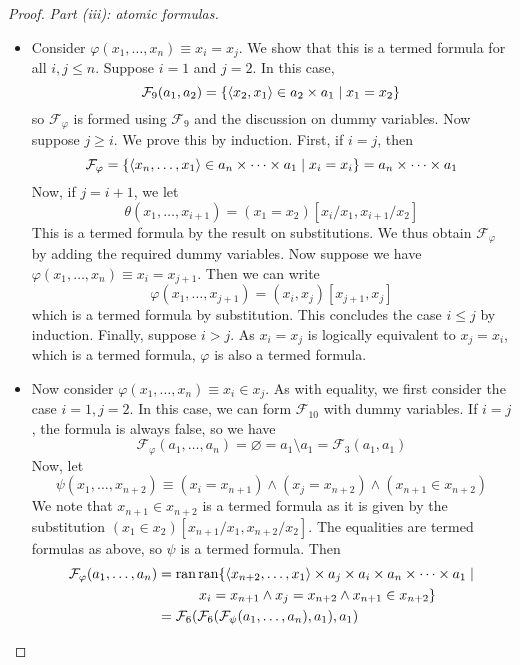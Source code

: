 \begin{proof}
    \emph{Part (iii): atomic formulas.}
    \begin{itemize}
        \item Consider \( \varphi(x_1, \dots, x_n) \equiv x_i = x_j \).
        We show that this is a termed formula for all \( i, j \leq n \).
        Suppose \( i = 1 \) and \( j = 2 \).
        In this case,
        \[ \mathcal F_9(a_1, a_2) = \qty{\langle x_2, x_1 \rangle \in a_2 \times a_1 \mid x_1 = x_2} \]
        so \( \mathcal F_\varphi \) is formed using \( \mathcal F_9 \) and the discussion on dummy variables.
        Now suppose \( j \geq i \).
        We prove this by induction.
        First, if \( i = j \), then
        \[ \mathcal F_\varphi = \qty{\langle x_n, \dots, x_1 \rangle \in a_n \times \dots \times a_1 \mid x_i = x_i} = a_n \times \dots \times a_1 \]
        Now, if \( j = i + 1 \), we let
        \[ \theta(x_1, \dots, x_{i+1}) = (x_1 = x_2)[x_i/x_1, x_{i+1}/x_2] \]
        This is a termed formula by the result on substitutions.
        We thus obtain \( \mathcal F_\varphi \) by adding the required dummy variables.
        Now suppose we have \( \varphi(x_1, \dots, x_n) \equiv x_i = x_{j+1} \).
        Then we can write
        \[ \varphi(x_1, \dots, x_{j+1}) = (x_i, x_j)[x_{j+1}, x_j] \]
        which is a termed formula by substitution.
        This concludes the case \( i \leq j \) by induction.
        Finally, suppose \( i > j \).
        As \( x_i = x_j \) is logically equivalent to \( x_j = x_i \), which is a termed formula, \( \varphi \) is also a termed formula.
        \item Now consider \( \varphi(x_1, \dots, x_n) \equiv x_i \in x_j \).
        As with equality, we first consider the case \( i = 1, j = 2 \).
        In this case, we can form \( \mathcal F_{10} \) with dummy variables.
        If \( i = j \), the formula is always false, so we have
        \[ \mathcal F_\varphi(a_1, \dots, a_n) = \varnothing = a_1 \setminus a_1 = \mathcal F_3(a_1, a_1) \]
        Now, let
        \[ \psi(x_1, \dots, x_{n+2}) \equiv (x_i = x_{n+1}) \wedge (x_j = x_{n+2}) \wedge (x_{n+1} \in x_{n+2}) \]
        We note that \( x_{n+1} \in x_{n+2} \) is a termed formula as it is given by the substitution \( (x_1 \in x_2)[x_{n+1}/x_1, x_{n+2}/x_2] \).
        The equalities are termed formulas as above, so \( \psi \) is a termed formula.
        Then
        \begin{align*}
            \mathcal F_\varphi(a_1, \dots, a_n) &=
            \operatorname{ran}\operatorname{ran}\{\langle x_{n+2}, \dots, x_1\rangle \times a_j \times a_i \times a_n \times \dots \times a_1 \mid \\&\quad\quad\quad x_i = x_{n+1} \wedge x_j = x_{n+2} \wedge x_{n+1} \in x_{n+2}\} \\
            &= \mathcal F_6(\mathcal F_6(\mathcal F_\psi(a_1, \dots, a_n), a_1), a_1)
        \end{align*}
    \end{itemize}


\end{proof}

